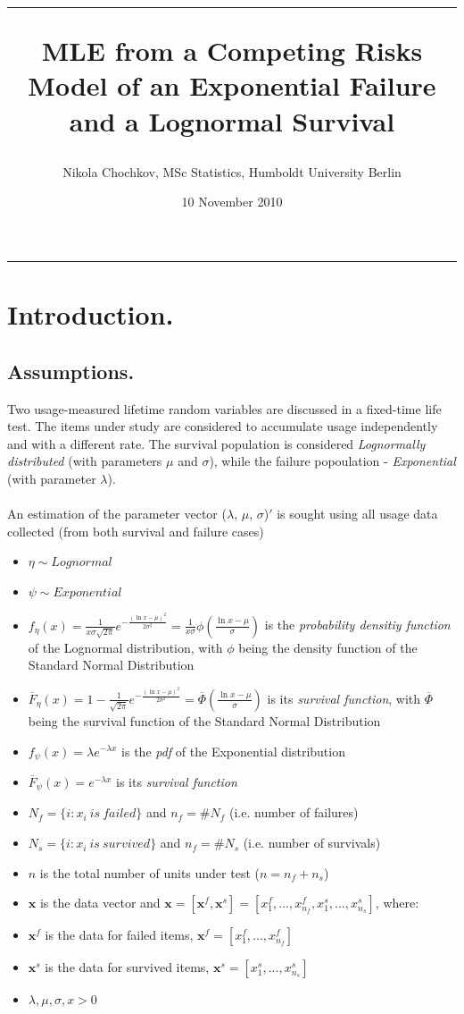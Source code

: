 \documentclass{article}
\title{\hrule \vspace{0.3cm}MLE from a Competing Risks Model of an Exponential Failure and a Lognormal Survival}
\date{10 November 2010}
\author{Nikola Chochkov, MSc Statistics, Humboldt University Berlin}
\begin{document}
\maketitle
\hrule
\section{Introduction.}
\subsection{Assumptions.}
\indent \indent Two usage-measured lifetime random variables are discussed in a fixed-time life test. The items under study are considered to accumulate usage independently and with a different rate. The survival population is considered \textit{Lognormally distributed} (with parameters $\mu$ and $\sigma$), while the failure popoulation - \textit{Exponential} (with parameter $\lambda$). 
\\ 
\\ \indent An estimation of the parameter vector ($\lambda$, $\mu$, $\sigma$)$'$ is sought using all usage data collected (from both survival and failure cases) 
\begin{itemize}
\item $\eta \sim Lognormal$ 
\item $\psi \sim Exponential$
\item $f_\eta(x) = \frac{1}{x \sigma \sqrt{2 \pi}} e^{-\frac{\left( \ln x - \mu \right)^2}{2\sigma^2}} = \frac{1}{x \sigma} \phi \left( \frac{\ln x - \mu}{\sigma} \right) $ is the \textit{probability densitiy function} of the Lognormal distribution, with $\phi$ being the density function of the Standard Normal Distribution
\item $\overline F_\eta(x) = 1 - \frac{1}{\sqrt{2 \pi}} e^{-\frac{\left( \ln x - \mu \right)^2}{2\sigma^2}} = \overline \Phi \left(\frac{\ln x - \mu}{\sigma}\right)$ is its \textit{survival function}, with $\overline\Phi$ being the survival function of the Standard Normal Distribution
\item $f_\psi(x) = \lambda e^{- \lambda x}$ is the \textit{pdf} of the Exponential distribution 
\item $\overline F_\psi(x) = e^{- \lambda x}$ is its \textit{survival function}
\item $N_f = \{i : x_i\ is\ failed \}$ and $n_f  = \# N_f$ (i.e. number of failures) 
\item $N_s = \{i : x_i\ is\ survived \}$ and $n_f  = \# N_s$ (i.e. number of survivals)
\item $n$ is the total number of units under test ($n = n_f + n_s$)
\item $\textbf{x}$ is the data vector and $\textbf{x} = \left[ \textbf{x}^f, \textbf{x}^s \right] = \left[ x_1^f, ... , x_{n_f}^f, x_1^s, ... , x_{n_s}^s \right] $, where:
\item $\textbf{x}^f$ is the data for failed items, $\textbf{x}^f = \left[ x_1^f, ... , x_{n_f}^f \right] $
\item $\textbf{x}^s$ is the data for survived items, $\textbf{x}^s = \left[ x_1^s, ... , x_{n_s}^s \right] $
\item $\lambda, \mu, \sigma, x > 0$
\end{itemize}
\end{document}
